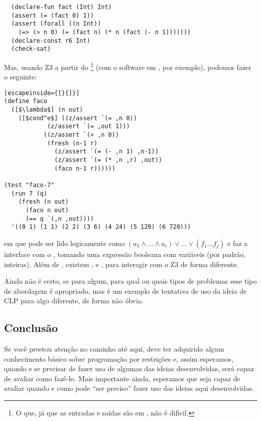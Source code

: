 \documentclass{article}
\begin{document}
\begin{lstlisting}
  (declare-fun fact (Int) Int)
  (assert (= (fact 0) 1))
  (assert (forall ((n Int))
    (=> (> n 0) (= (fact n) (* n (fact (- n 1)))))))
  (declare-const r6 Int)
  (check-sat)
\end{lstlisting}

Mas, usando Z3 a partir do \footnote{O que, já que as
  entradas e saídas são em , não é difícil.} (com o
software em \cite{namin}, por exemplo), podemos fazer o seguinte:

\begin{lstlisting}[escapeinside={[}{]}]
(define faco
  ([$\lambda$] (n out)
    ([$cond^e$] ((z/assert `(= ,n 0))
            (z/assert `(= ,out 1)))
           ((z/assert `(> ,n 0))
            (fresh (n-1 r)
              (z/assert `(= (- ,n 1) ,n-1))
              (z/assert `(= (* ,n ,r) ,out))
              (faco n-1 r))))))

(test "faco-7"
  (run 7 (q)
    (fresh (n out)
      (faco n out)
      (== q `(,n ,out))))
  '((0 1) (1 1) (2 2) (3 6) (4 24) (5 120) (6 720)))

\end{lstlisting}

\noindent em que  pode ser lido logicamente como $(a_1 \wedge ... \wedge a_i) \vee
... \vee (f_1 ... f_j)$ e  faz a interface com o
, tomando uma expressão booleana com variáveis (por
padrão, inteiras). Além de , existem ,
 e , para interagir com o Z3 de forma
diferente.

Ainda não é certo, se para algum, para qual ou quais tipos de
problemas esse tipo de abordagem é apropriado, mas é um exemplo de
tentativa de uso da ideia de CLP para algo diferente, de forma não
óbvia.
           
\subsection{Conclusão}



Se você prestou atenção no caminho até aqui, deve ter adquirido algum
conhecimento básico sobre programação por restrições e, assim
esperamos, quando e se precisar de fazer uso de algumas das ideias
desenvolvidas, será capaz de avaliar como fazê-lo. Mais importante
ainda, esperamos que seja capaz de avaliar quando e como pode ``ser
preciso'' fazer uso das ideias aqui desenvolvidas.
\end{document}
